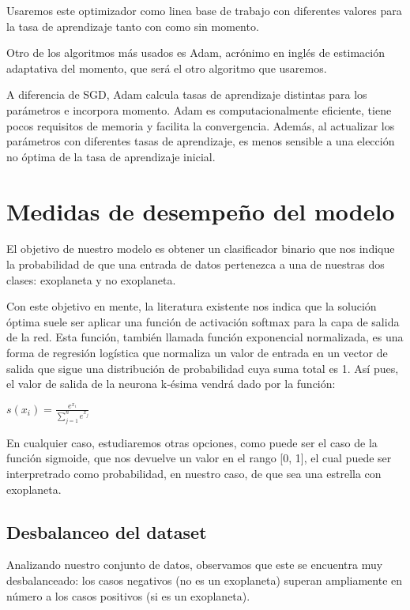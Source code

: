 Usaremos este optimizador como linea base de trabajo con diferentes
valores para la tasa de aprendizaje tanto con como sin momento.

Otro de los algoritmos más usados es Adam, acrónimo en inglés de
estimación adaptativa del momento, que será el otro algoritmo que
usaremos.

A diferencia de SGD, Adam calcula tasas de aprendizaje distintas para
los parámetros e incorpora momento. Adam es computacionalmente
eficiente, tiene pocos requisitos de memoria y facilita la convergencia.
Además, al actualizar los parámetros con diferentes tasas de
aprendizaje, es menos sensible a una elección no óptima de la tasa de
aprendizaje inicial.

\section{Medidas de desempeño del modelo}\label{metricas}

El objetivo de nuestro modelo es obtener un clasificador binario que nos
indique la probabilidad de que una entrada de datos pertenezca a una de
nuestras dos clases: exoplaneta y no exoplaneta.

Con este objetivo en mente, la literatura existente nos indica que la
solución óptima suele ser aplicar una función de activación softmax para
la capa de salida de la red. Esta función, también llamada función
exponencial normalizada, es una forma de regresión logística que
normaliza un valor de entrada en un vector de salida que sigue una
distribución de probabilidad cuya suma total es 1. Así pues, el valor de
salida de la neurona k-ésima vendrá dado por la función:

\begin{math}
s(x_{i})=\frac{e^{x_{i}}}{\sum_{j=1}^{n}e^{x_j}}
\end{math}

En cualquier caso, estudiaremos otras opciones, como puede ser el caso
de la función sigmoide, que nos devuelve un valor en el rango {[}0,
1{]}, el cual puede ser interpretrado como probabilidad, en nuestro
caso, de que sea una estrella con exoplaneta.

\subsection{Desbalanceo del dataset}\label{desbalanceo-del-dataset}

Analizando nuestro conjunto de datos, observamos que este se encuentra
muy desbalanceado: los casos negativos (no es un exoplaneta) superan
ampliamente en número a los casos positivos (si es un exoplaneta).

